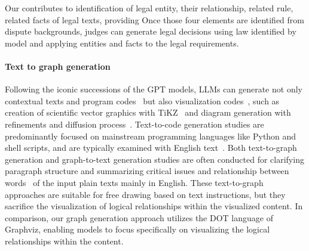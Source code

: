 \if[]
Our \datasetName contributes to identification of legal entity, their relationship, related rule, related facts of legal texts, providing 
Once those four elements are identified from dispute backgrounds, judges can generate legal decisions using law identified by model and applying entities and facts to the legal requirements.
\fi


\paragraph{Text to graph generation}
Following the iconic successions of the GPT models, LLMs can generate not only contextual texts and program codes~\citep{shi-etal-2022-natural, christopoulou-etal-2024-text} but also visualization codes~\citep{SparksofAGI}, such as creation of scientific vector graphics with TiKZ~\cite{automatikz}
and diagram generation with refinements and diffusion process~\cite{Zala2023DiagrammerGPT}.
Text-to-code generation studies are predominantly focused on mainstream programming languages like Python and shell scripts, and are typically examined with English text~\citep{shi-etal-2022-natural, christopoulou-etal-2024-text}.
Both text-to-graph generation and graph-to-text generation studies are often conducted for clarifying paragraph structure and summarizing critical issues and relationship between words~\citep{koncel-kedziorski-etal-2019-text, jin-etal-2020-genwiki} of the input plain texts mainly in English.
These text-to-graph approaches are suitable for free drawing based on text instructions, but they sacrifice the visualization of logical relationships within the visualized content. 
In comparison, our graph generation approach utilizes the DOT language of Graphviz, enabling models to focus specifically on visualizing the logical relationships within the content.